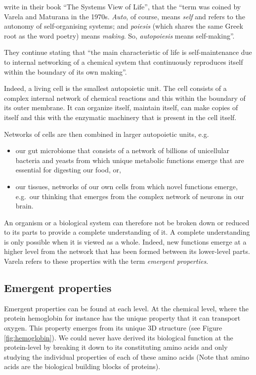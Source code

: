 \documentclass[
  11pt,
]{book}
\providecommand{\tightlist}{%
  \setlength{\itemsep}{0pt}\setlength{\parskip}{0pt}}
\begin{document}
\citet{capraLuisi2014} write in their book ``The Systems View of Life'', that the ``term was coined by Varela and Maturana in the 1970s. \emph{Auto}, of course, means \emph{self} and refers to the autonomy of self-organising systems; and \emph{poiesis} (which shares the same Greek root as the word poetry) means \emph{making}. So, \emph{autopoiesis} means self-making''.

They continue stating that ``the main characteristic of life is self-maintenance due to internal networking of a chemical system that continuously reproduces itself within the boundary of its own making''.

Indeed, a living cell is the smallest autopoietic unit.
The cell consists of a complex internal network of chemical reactions and this within the boundary of its outer membrane.
It can organize itself, maintain itself, can make copies of itself and this with the enzymatic machinery that is present in the cell itself.

Networks of cells are then combined in larger autopoietic units, e.g.~

\begin{itemize}
\tightlist
\item
  our gut microbiome that consists of a network of billions of unicellular bacteria and yeasts from which unique metabolic functions emerge that are essential for digesting our food, or,
\item
  our tissues, networks of our own cells from which novel functions emerge, e.g.~our thinking that emerges from the complex network of neurons in our brain.
\end{itemize}

An organism or a biological system can therefore not be broken down or reduced to its parts to provide a complete understanding of it. A complete understanding is only possible when it is viewed as a whole.
Indeed, new functions emerge at a higher level from the network that has been formed between its lower-level parts. Varela refers to these properties with the term \emph{emergent properties}.

\hypertarget{emergent-properties}{%
\subsection{Emergent properties}\label{emergent-properties}}

Emergent properties can be found at each level. At the chemical level, where the protein hemoglobin for instance has the unique property that it can transport oxygen. This property emerges from its unique 3D structure (see Figure \ref{fig:hemoglobin}). We could never have derived its biological function at the protein-level by breaking it down to its constituting amino acids and only studying the individual properties of each of these amino acids (Note that amino acids are the biological building blocks of proteins).
\end{document}
